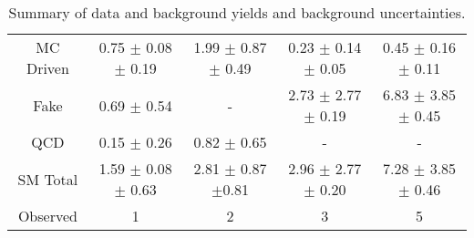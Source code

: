 \begin{table}[!Hhtb]
\begin{center}
\begin{tabular}{c|c|c|c|c}
\hline
\hline
		& \tauTau\binone & \tauTau\bintwo & \eTau & \muTau \\
\hline
MC Driven &  0.75 $\pm$ 0.08 $\pm$ 0.19 & 1.99 $\pm$ 0.87 $\pm$ 0.49  & 0.23 $\pm$ 0.14 $\pm$ 0.05 & 0.45 $\pm$ 0.16  $\pm$ 0.11\\
Fake      &     0.69 $\pm$ 0.54         &           -                 & 2.73 $\pm$ 2.77 $\pm$ 0.19 & 6.83 $\pm$ 3.85  $\pm$ 0.45\\
QCD       &     0.15 $\pm$ 0.26         &         0.82 $\pm$ 0.65     &             -              &            -       \\
\hline
SM Total  & 1.59 $\pm$ 0.08 $\pm$ 0.63  & 2.81  $\pm$ 0.87 $\pm$0.81  & 2.96 $\pm$ 2.77 $\pm$ 0.20 & 7.28 $\pm$ 3.85  $\pm$ 0.46\\
\hline
\hline
Observed   & 1     & 2     & 3   & 5 \\  
\hline
\hline
\end{tabular}
\caption{Summary of data and background yields and background uncertainties.}
\label{tbl:yieldSysSummary}
\end{center}
\end{table}
